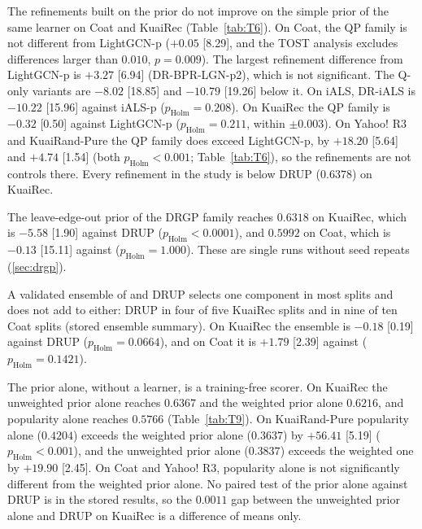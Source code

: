 The refinements built on the prior do not improve on the simple prior of the same learner on Coat and KuaiRec
(Table~\ref{tab:T6}). On Coat, the QP family is not different from LightGCN-p ($+0.05$ [8.29], and the TOST analysis
excludes differences larger than $0.010$, $p=0.009$). The largest refinement difference from LightGCN-p is $+3.27$ [6.94]
(DR-BPR-LGN-p2), which is not significant. The Q-only variants are $-8.02$ [18.85] and $-10.79$ [19.26] below it. On
iALS, DR-iALS is $-10.22$ [15.96] against iALS-p ($p_\mathrm{Holm}=0.208$). On KuaiRec the QP family is $-0.32$ [0.50]
against LightGCN-p ($p_\mathrm{Holm}=0.211$, within $\pm0.003$). On Yahoo! R3 and KuaiRand-Pure the QP family does
exceed LightGCN-p, by $+18.20$ [5.64] and $+4.74$ [1.54] (both $p_\mathrm{Holm}<0.001$; Table~\ref{tab:T6}), so the
refinements are not controls there. Every refinement in the study is below DRUP ($0.6378$) on KuaiRec.



The leave-edge-out prior of the DRGP family reaches $0.6318$ on KuaiRec, which is $-5.58$ [1.90] against DRUP
($p_\mathrm{Holm}<0.0001$), and $0.5992$ on Coat, which is $-0.13$ [15.11] against \qp{} ($p_\mathrm{Holm}=1.000$).
These are single runs without seed repeats (\ref{sec:drgp}).

A validated ensemble of \qp{} and DRUP selects one component in most splits and does not add to either: DRUP in four
of five KuaiRec splits and \qp{} in nine of ten Coat splits (stored ensemble summary). On KuaiRec the ensemble is
$-0.18$ [0.19] against DRUP ($p_\mathrm{Holm}=0.0664$), and on Coat it is $+1.79$ [2.39] against \qp{}
($p_\mathrm{Holm}=0.1421$).

The prior alone, without a learner, is a training-free scorer. On KuaiRec the unweighted prior alone reaches $0.6367$
and the weighted prior alone $0.6216$, and popularity alone reaches $0.5766$ (Table~\ref{tab:T9}). On KuaiRand-Pure
popularity alone ($0.4204$) exceeds the weighted prior alone ($0.3637$) by $+56.41$ [5.19] ($p_\mathrm{Holm}<0.001$),
and the unweighted prior alone ($0.3837$) exceeds the weighted one by $+19.90$ [2.45]. On Coat and Yahoo! R3,
popularity alone is not significantly different from the weighted prior alone. No paired test of the prior alone
against DRUP is in the stored results, so the $0.0011$ gap between the unweighted prior alone and DRUP on KuaiRec is
a difference of means only.
